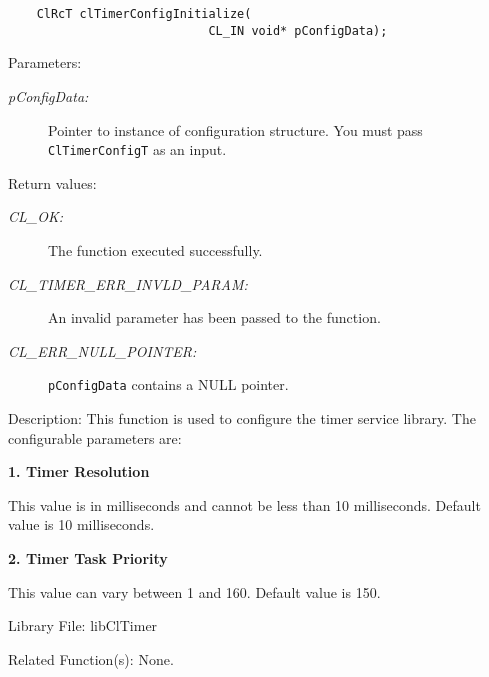 \begin{flushleft}
\begin{Desc}
\footnotesize\begin{verbatim}    ClRcT clTimerConfigInitialize(
              				CL_IN void* pConfigData);
\end{verbatim}
\normalsize
\end{Desc}
\begin{Desc}
\item[Parameters:]
\begin{description}
\item[{\em p\-Config\-Data:}]Pointer to instance of configuration structure. You must pass 
{\tt{ClTimerConfigT}} as an input.\end{description}
\end{Desc}
\begin{Desc}
\item[Return values:]
\begin{description}
\item[{\em CL\_\-OK:}]The function executed successfully. 
\item[{\em CL\_\-TIMER\_\-ERR\_\-INVLD\_\-PARAM:}]An invalid parameter has been passed to the function. 
\item[{\em CL\_\-ERR\_\-NULL\_\-POINTER:}]{\tt{pConfigData}} contains a NULL pointer.\end{description}
\end{Desc}
\begin{Desc}
\item[Description:]This function is used to configure the timer service library. The configurable parameters are: \par
 \par
 {\bf  1. Timer Resolution } \par
 This value is in milliseconds and cannot be less than 10 milliseconds. Default value is 10 milliseconds. \par
 \par
 {\bf  2. Timer Task Priority } \par
 This value can vary between 1 and 160. Default value is 150.\end{Desc}
\begin{Desc}
\item[Library File:]lib\-Cl\-Timer\end{Desc}
\begin{Desc}
\item[Related Function(s):]None. \end{Desc}


\newpage



\end{flushleft}
